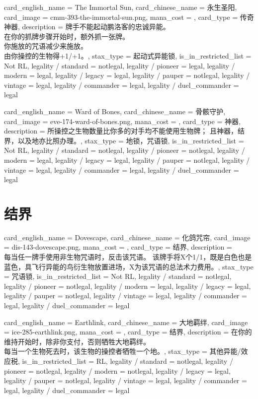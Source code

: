 \documentclass[lang = cn, color = black, 10pt]{AllThatStax}
\begin{document}
\card
{
	card_english_name = {The Immortal Sun},
	card_chinese_name = {永生圣阳},
	card_image = cmm-393-the-immortal-sun.png,
	mana_cost = ,
	card_type = 传奇神器,
	description = {牌手不能起动鹏洛客的忠诚异能。\\
在你的抓牌步骤开始时，额外抓一张牌。\\
你施放的咒语减少来施放。\\
由你操控的生物得+1/+1。},
	stax_type = 起动式异能锁,
	is_in_restricted_list = Not RL,
	legality / standard = notlegal,
	legality / pioneer = legal,
	legality / modern = legal,
	legality / legacy = legal,
	legality / pauper = notlegal,
	legality / vintage = legal,
	legality / commander = legal,
	legality / duel_commander = legal
}

\card
{
	card_english_name = {Ward of Bones},
	card_chinese_name = {骨骸守护},
	card_image = eve-174-ward-of-bones.png,
	mana_cost = ,
	card_type = 神器,
	description = {所操控之生物数量比你多的对手均不能使用生物牌； 且神器，结界，以及地亦比照办理。},
	stax_type = 地锁，咒语锁,
	is_in_restricted_list = Not RL,
	legality / standard = notlegal,
	legality / pioneer = notlegal,
	legality / modern = legal,
	legality / legacy = legal,
	legality / pauper = notlegal,
	legality / vintage = legal,
	legality / commander = legal,
	legality / duel_commander = legal
}

\section{结界}

\card
{
	card_english_name = {Dovescape},
	card_chinese_name = {化鸽咒帘},
	card_image = dis-143-dovescape.png,
	mana_cost = ,
	card_type = 结界,
	description = {\\
每当任一牌手使用非生物咒语时，反击该咒语。 该牌手将X个1/1，既是白色也是蓝色，具飞行异能的鸟衍生物放置进场，X为该咒语的总法术力费用。},
	stax_type = 咒语锁,
	is_in_restricted_list = Not RL,
	legality / standard = notlegal,
	legality / pioneer = notlegal,
	legality / modern = legal,
	legality / legacy = legal,
	legality / pauper = notlegal,
	legality / vintage = legal,
	legality / commander = legal,
	legality / duel_commander = legal
}

\card
{
	card_english_name = {Earthlink},
	card_chinese_name = {大地羁绊},
	card_image = ice-285-earthlink.png,
	mana_cost = ,
	card_type = 结界,
	description = {在你的维持开始时，除非你支付，否则牺牲大地羁绊。\\
每当一个生物死去时，该生物的操控者牺牲一个地。},
	stax_type = 其他异能/效应税,
	is_in_restricted_list = RL,
	legality / standard = notlegal,
	legality / pioneer = notlegal,
	legality / modern = notlegal,
	legality / legacy = legal,
	legality / pauper = notlegal,
	legality / vintage = legal,
	legality / commander = legal,
	legality / duel_commander = legal
}
\end{document}
